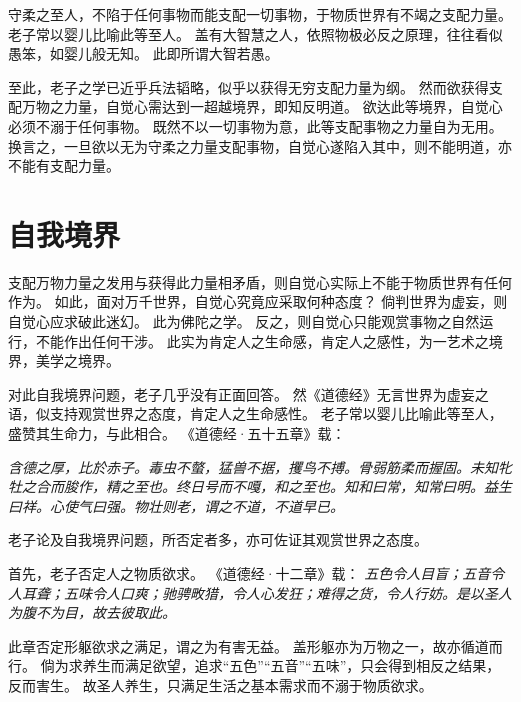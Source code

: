 \documentclass[11pt]{article}
\begin{document}
\newline

守柔之至人，不陷于任何事物而能支配一切事物，于物质世界有不竭之支配力量。
老子常以婴儿比喻此等至人。
盖有大智慧之人，依照物极必反之原理，往往看似愚笨，如婴儿般无知。
此即所谓大智若愚。

\newline

至此，老子之学已近乎兵法韬略，似乎以获得无穷支配力量为纲。
然而欲获得支配万物之力量，自觉心需达到一超越境界，即知反明道。
欲达此等境界，自觉心必须不溺于任何事物。
既然不以一切事物为意，此等支配事物之力量自为无用。
换言之，一旦欲以无为守柔之力量支配事物，自觉心遂陷入其中，则不能明道，亦不能有支配力量。

\section{自我境界}
支配万物力量之发用与获得此力量相矛盾，则自觉心实际上不能于物质世界有任何作为。
如此，面对万千世界，自觉心究竟应采取何种态度？
倘判世界为虚妄，则自觉心应求破此迷幻。
此为佛陀之学。
反之，则自觉心只能观赏事物之自然运行，不能作出任何干涉。
此实为肯定人之生命感，肯定人之感性，为一艺术之境界，美学之境界。

\newline

对此自我境界问题，老子几乎没有正面回答。
然《道德经》无言世界为虚妄之语，似支持观赏世界之态度，肯定人之生命感性。
老子常以婴儿比喻此等至人，盛赞其生命力，与此相合。
《道德经·五十五章》载：

\textit{含德之厚，比於赤子。毒虫不螫，猛兽不据，攫鸟不搏。骨弱筋柔而握固。未知牝牡之合而朘作，精之至也。终日号而不嘎，和之至也。知和曰常，知常曰明。益生曰祥。心使气曰强。物壮则老，谓之不道，不道早已。}

\newline

老子论及自我境界问题，所否定者多，亦可佐证其观赏世界之态度。

\newline

首先，老子否定人之物质欲求。
《道德经·十二章》载：
\textit{五色令人目盲；五音令人耳聋；五味令人口爽；驰骋畋猎，令人心发狂；难得之货，令人行妨。是以圣人为腹不为目，故去彼取此。}

此章否定形躯欲求之满足，谓之为有害无益。
盖形躯亦为万物之一，故亦循道而行。
倘为求养生而满足欲望，追求“五色”“五音”“五味”，只会得到相反之结果，反而害生。
故圣人养生，只满足生活之基本需求而不溺于物质欲求。

\newline
\end{document}
